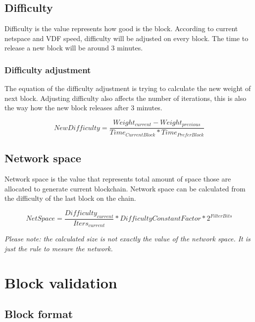 \subsection{Difficulty}
\begin{flushleft}
    Difficulty is the value represents how good is the block. According to current netspace and VDF speed, difficulty will be adjusted on every block. The time to release a new block will be around 3 minutes.
\end{flushleft}
\subsubsection{Difficulty adjustment}
\begin{flushleft}
    The equation of the difficulty adjustment is trying to calculate the new weight of next block. Adjusting difficulty also affects the number of iterations, this is also the way how the new block releases after 3 minutes.
\end{flushleft}
\begin{equation}
    NewDifficulty = \frac{Weight_{current} - Weight_{previous}}{Time_{CurrentBlock} * Time_{PreferBlock}}
\end{equation}
\subsection{Network space}
\begin{flushleft}
    Network space is the value that represents total amount of space those are allocated to generate current blockchain. Network space can be calculated from the difficulty of the last block on the chain.
\end{flushleft}
\begin{equation}
    NetSpace = \frac{Difficulty_{current}}{Iters_{current}}*{DifficultyConstantFactor}*2^{FilterBits}
\end{equation}
\begin{flushleft}
    \textit{Please note: the calculated size is not exactly the value of the network space. It is just the rule to mesure the network.}
\end{flushleft}
\section{Block validation}
\subsection{Block format}
